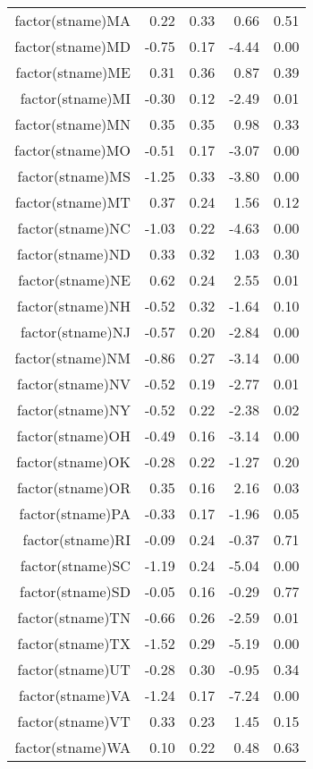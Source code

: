 \begin{table}[ht]
\begin{tabular}{rrrrr}
  factor(stname)MA & 0.22 & 0.33 & 0.66 & 0.51 \\ 
  factor(stname)MD & -0.75 & 0.17 & -4.44 & 0.00 \\ 
  factor(stname)ME & 0.31 & 0.36 & 0.87 & 0.39 \\ 
  factor(stname)MI & -0.30 & 0.12 & -2.49 & 0.01 \\ 
  factor(stname)MN & 0.35 & 0.35 & 0.98 & 0.33 \\ 
  factor(stname)MO & -0.51 & 0.17 & -3.07 & 0.00 \\ 
  factor(stname)MS & -1.25 & 0.33 & -3.80 & 0.00 \\ 
  factor(stname)MT & 0.37 & 0.24 & 1.56 & 0.12 \\ 
  factor(stname)NC & -1.03 & 0.22 & -4.63 & 0.00 \\ 
  factor(stname)ND & 0.33 & 0.32 & 1.03 & 0.30 \\ 
  factor(stname)NE & 0.62 & 0.24 & 2.55 & 0.01 \\ 
  factor(stname)NH & -0.52 & 0.32 & -1.64 & 0.10 \\ 
  factor(stname)NJ & -0.57 & 0.20 & -2.84 & 0.00 \\ 
  factor(stname)NM & -0.86 & 0.27 & -3.14 & 0.00 \\ 
  factor(stname)NV & -0.52 & 0.19 & -2.77 & 0.01 \\ 
  factor(stname)NY & -0.52 & 0.22 & -2.38 & 0.02 \\ 
  factor(stname)OH & -0.49 & 0.16 & -3.14 & 0.00 \\ 
  factor(stname)OK & -0.28 & 0.22 & -1.27 & 0.20 \\ 
  factor(stname)OR & 0.35 & 0.16 & 2.16 & 0.03 \\ 
  factor(stname)PA & -0.33 & 0.17 & -1.96 & 0.05 \\ 
  factor(stname)RI & -0.09 & 0.24 & -0.37 & 0.71 \\ 
  factor(stname)SC & -1.19 & 0.24 & -5.04 & 0.00 \\ 
  factor(stname)SD & -0.05 & 0.16 & -0.29 & 0.77 \\ 
  factor(stname)TN & -0.66 & 0.26 & -2.59 & 0.01 \\ 
  factor(stname)TX & -1.52 & 0.29 & -5.19 & 0.00 \\ 
  factor(stname)UT & -0.28 & 0.30 & -0.95 & 0.34 \\ 
  factor(stname)VA & -1.24 & 0.17 & -7.24 & 0.00 \\ 
  factor(stname)VT & 0.33 & 0.23 & 1.45 & 0.15 \\ 
  factor(stname)WA & 0.10 & 0.22 & 0.48 & 0.63 \\ 

\end{tabular}
\end{table}

